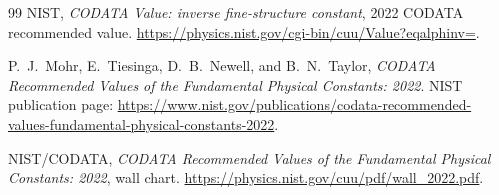 \documentclass[11pt]{article}
\theoremstyle{remark}
\begin{document}
\begin{thebibliography}{99}
NIST,
\emph{CODATA Value: inverse fine-structure constant},
2022 CODATA recommended value.
\url{https://physics.nist.gov/cgi-bin/cuu/Value?eqalphinv=}.

P.\ J.\ Mohr, E.\ Tiesinga, D.\ B.\ Newell, and B.\ N.\ Taylor,
\emph{CODATA Recommended Values of the Fundamental Physical Constants: 2022}.
NIST publication page:
\url{https://www.nist.gov/publications/codata-recommended-values-fundamental-physical-constants-2022}.

NIST/CODATA,
\emph{CODATA Recommended Values of the Fundamental Physical Constants: 2022},
wall chart.
\url{https://physics.nist.gov/cuu/pdf/wall_2022.pdf}.

\end{thebibliography}
\end{document}
